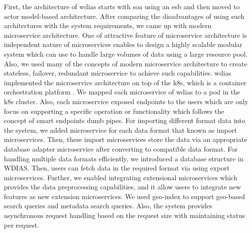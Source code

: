 First, the architecture of \acrshort{wdias} starts with \acrshort{soa} using an \acrfull{esb} and then moved to actor model-based architecture. After comparing the disadvantages of using such architectures with the system requirements, we came up with modern microservice architecture. One of attractive feature of microservice architecture is independent nature of microservices enables to design a highly scalable modular system which can use to handle large volumes of data using a large resource pool. Also, we used many of the concepts of modern microservice architecture to create stateless, failover, redundant microservice to achieve such capabilities. \acrshort{wdias} implemented the microservice architecture on top of the \acrshort{k8s}, which is a container orchestration platform \cite{GihanChanukaKarunarathne2020WDIAS:System}. We mapped each microservice of \acrshort{wdias} to a pod in the \acrshort{k8s} cluster. Also, each microservice exposed endpoints to the users which are only focus on supporting a specific operation or functionality which follows the concept of smart endpoints dumb pipes. For importing different format data into the system, we added microservice for each data format that known as import microservices. Then, these import microservices store the data via an appropriate database adapter microservice after converting to compatible data format. For handling multiple data formats efficiently, we introduced a database structure in WDIAS. Then, users can fetch data in the required format via using export microservices. Further, we enabled integrating extensional microservices which provides the data preprocessing capabilities, and it allow users to integrate new features as new extension microservices. We used geo-index to support geo-based search queries and metadata search queries. Also, the system provides asynchronous request handling based on the request size with maintaining status per request.

